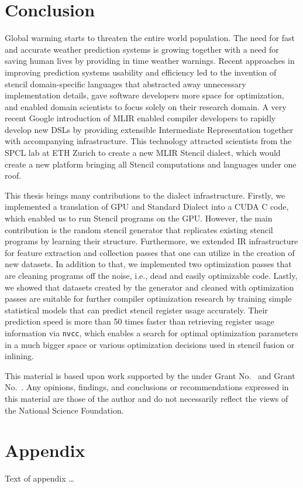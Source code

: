 \documentclass[sigplan,\review anonymous]{acmart}
\begin{document}
\section{Conclusion}

Global warming starts to threaten the entire world population. The
need for fast and accurate weather prediction systems is growing
together with a need for saving human lives by providing in time weather
warnings. Recent approaches in improving prediction systems usability
and efficiency led to the invention of stencil domain-specific languages
that abstracted away unnecessary implementation details, gave software
developers more space for optimization, and enabled domain scientists
to focus solely on their research domain. A very recent Google introduction
of MLIR enabled compiler developers to rapidly develop new DSLs by providing
extensible Intermediate Representation together with accompanying
infrastructure. This technology attracted scientists from the SPCL lab at
ETH Zurich to create a new MLIR Stencil dialect, which would create a new
platform bringing all Stencil computations and languages under one roof. 

This thesis brings many contributions to the dialect infrastructure. Firstly,
we implemented a translation of GPU and Standard Dialect into a CUDA C code,
which enabled us to run Stencil programs on the GPU. However, the main
contribution is the random stencil generator that replicates existing stencil
programs by learning their structure. Furthermore, we extended IR
infrastructure for feature extraction and collection passes that one can
utilize in the creation of new datasets. In addition to that, we implemented
two optimization passes that are cleaning programs off the noise, i.e., dead
and easily optimizable code. Lastly, we showed that datasets created by the
generator and cleaned with optimization passes are suitable for further
compiler optimization research by training simple statistical models that
can predict stencil register usage accurately. Their prediction speed is
more than 50 times faster than retrieving register usage information via
\texttt{nvcc}, which enables a search for optimal optimization parameters
in a much bigger space or various optimization decisions used in stencil
fusion or inlining.

\begin{acks}                            %
  This material is based upon work supported by the
   under Grant
  No.~ and Grant
  No.~.  Any opinions, findings, and
  conclusions or recommendations expressed in this material are those
  of the author and do not necessarily reflect the views of the
  National Science Foundation.
\end{acks}

%


\appendix
\section{Appendix}

Text of appendix \ldots
\end{document}
